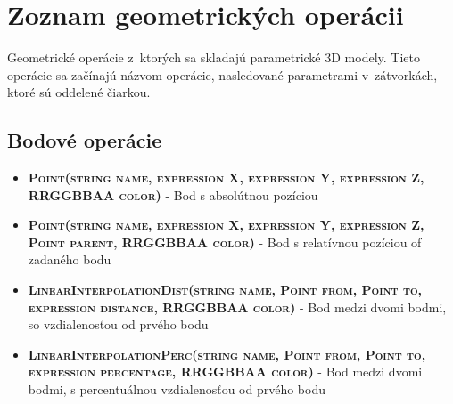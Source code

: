 \chapter{Zoznam geometrických operácii}
\label{Priloha:zoznamGeometrickychOperacii}
Geometrické operácie z~ktorých sa skladajú parametrické 3D modely. Tieto operácie sa začínajú názvom operácie, nasledované parametrami v~zátvorkách, ktoré sú oddelené čiarkou.

\section*{Bodové operácie}
\begin{itemize}


\item \textsc{\textbf{Point(string name, expression X, expression Y, expression Z, RRGGBBAA color)}} - Bod s absolútnou pozíciou 
\item \textsc{\textbf{Point(string name, expression X, expression Y, expression Z, Point parent, RRGGBBAA color)}} - Bod s relatívnou pozíciou of zadaného bodu

\item \textsc{\textbf{LinearInterpolationDist(string name, Point from, Point to, expression distance, RRGGBBAA color)}} - Bod medzi dvomi bodmi, so vzdialenosťou od prvého bodu
		 
\item \textsc{\textbf{LinearInterpolationPerc(string name, Point from, Point to, expression percentage, RRGGBBAA color)}} - Bod medzi dvomi bodmi, s percentuálnou vzdialenosťou od prvého bodu


\end{itemize}
